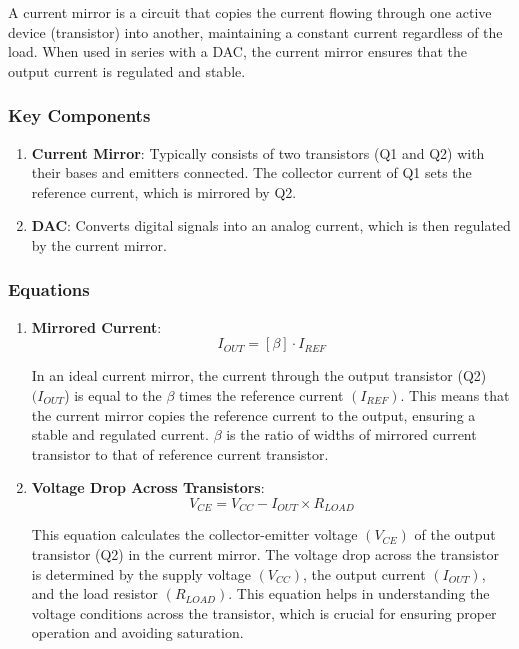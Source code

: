 A current mirror is a circuit that copies the current flowing through one active device (transistor) into another, maintaining a constant current regardless of the load. When used in series with a DAC, the current mirror ensures that the output current is regulated and stable.

\subsubsection{Key Components}

\begin{enumerate}
    \item \textbf{Current Mirror}: Typically consists of two transistors (Q1 and Q2) with their bases and emitters connected. The collector current of Q1 sets the reference current, which is mirrored by Q2.
    \item \textbf{DAC}: Converts digital signals into an analog current, which is then regulated by the current mirror.
\end{enumerate}

\subsubsection{Equations}

\begin{enumerate}
   
    \item \textbf{Mirrored Current}:
    \begin{equation}
\label{c3:eq15}
    I_{OUT} = [\beta] \cdot I_{REF}
\end{equation}
    
    In an ideal current mirror, the current through the output transistor (Q2) \(( I_{OUT} \)) is equal to the \(\beta\) times the reference current \(( I_{REF} )\). This means that the current mirror copies the reference current to the output, ensuring a stable and regulated current. \(\beta\) is the ratio of widths of mirrored current transistor to that of reference current transistor\cite{er1}.
    \item \textbf{Voltage Drop Across Transistors}:
    \begin{equation}
\label{c3:eq16}
    V_{CE} = V_{CC} - I_{OUT} \times R_{LOAD}
\end{equation}
    
    This equation calculates the collector-emitter voltage \(( V_{CE} )\) of the output transistor (Q2) in the current mirror. The voltage drop across the transistor is determined by the supply voltage \(( V_{CC} )\), the output current \(( I_{OUT} )\), and the load resistor \(( R_{LOAD} )\). This equation helps in understanding the voltage conditions across the transistor, which is crucial for ensuring proper operation and avoiding saturation\cite{er2}.
\end{enumerate}

